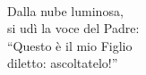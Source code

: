 
\\

\spazio

Dalla nube luminosa,\\
si udì la voce del Padre:\\
``Questo è il mio Figlio\\
diletto: ascoltatelo!''

\spazio

